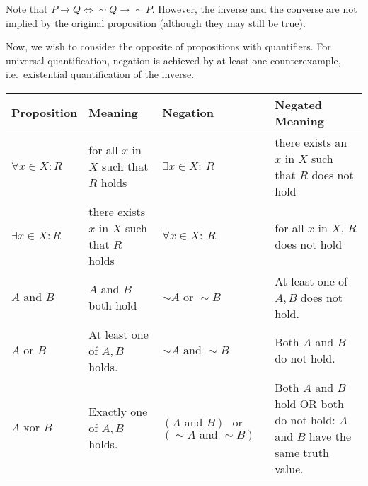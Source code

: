 \documentclass[a4paper,12pt,oneside,leqno]{scrartcl}%
\newcommand{\enquote}[1]{\frqq{}#1\flqq{}}
\begin{document}
Note that $P\rightarrow{}Q \Leftrightarrow \sim{}Q\rightarrow{}\sim{}P$.  However, the inverse and the converse are not implied by the original proposition (although they may still be true).

Now, we wish to consider the opposite of propositions with quantifiers.  For universal quantification, negation is achieved by at least one counterexample, i.e.\ existential quantification of the inverse. 

\begin{center}
\begin{tabular}{l p{5cm} p{3cm} p{5cm} }
\toprule
 Proposition & Meaning & Negation & Negated Meaning  \\
\midrule
 $\forall x \in X: R$ & \enquote{for all $x$ in $X$ such that $R$ holds} & $\exists x \in X: ~R$ & \enquote{there exists an $x$ in $X$ such that $R$ does not hold}\\
 $\exists x \in X: R$ & \enquote{there exists $x$ in $X$ such that $R$ holds} & $\forall x \in X: ~R$ & \enquote{for all $x$ in $X$, $R$ does not hold}\\
 $A \text{ and } B $ & \enquote{$A$ and $B$ both hold} & $\sim{}A \text{ or } \sim{} B $ & \enquote{At least one of $A,B$ does not hold.}\\
 $A \text{ or } B $ & \enquote{At least one of $A, B$ holds.} & $\sim{}A \text{ and } \sim{} B $ & \enquote{Both $A$ and $B$ do not hold.} \\
 $A \text{ xor } B $ & \enquote{Exactly one of $A,B$ holds.} & $(A \text{ and } B)$ \linebreak \centering $\text{ or }$ \linebreak $(\sim{}A \text{ and } \sim{} B) $ & \enquote{Both $A$ and $B$ hold OR both do not hold:  $A$ and $B$ have the same truth value.}\\
\bottomrule
\end{tabular}
\end{center}
\label{tab:negation}





\end{document}
